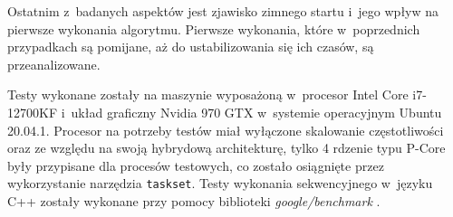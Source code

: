 Ostatnim z~badanych aspektów jest zjawisko zimnego startu i~jego wpływ na pierwsze wykonania algorytmu. Pierwsze wykonania, które w~poprzednich przypadkach są pomijane, aż do ustabilizowania się ich czasów, są przeanalizowane. 

Testy wykonane zostały na maszynie wyposażoną w~procesor Intel\textsuperscript{\tiny\textregistered} Core\textsuperscript{\tiny\texttrademark} i7-12700KF i~układ graficzny Nvidia 970 GTX w~systemie operacyjnym Ubuntu 20.04.1. Procesor na potrzeby testów miał wyłączone skalowanie częstotliwości oraz ze względu na swoją hybrydową architekturę, tylko 4 rdzenie typu P-Core były przypisane dla procesów testowych, co zostało osiągnięte przez wykorzystanie narzędzia \lstinline{taskset}. Testy wykonania sekwencyjnego w~języku C++ zostały wykonane przy pomocy biblioteki \textit{google/benchmark} \cite{google-benchmark}.
